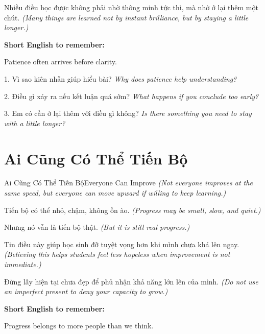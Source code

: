\begin{baihoc}
Nhiều điều học được không phải nhờ thông minh tức thì, mà nhờ ở lại thêm một chút.
\textit{(Many things are learned not by instant brilliance, but by staying a little longer.)}
\end{baihoc}

\begin{ghinhoanh}
\textbf{Short English to remember:}

Patience often arrives before clarity.

\end{ghinhoanh}

\begin{tuhocnhanh}
1. Vì sao kiên nhẫn giúp hiểu bài? \textit{Why does patience help understanding?}

2. Điều gì xảy ra nếu kết luận quá sớm? \textit{What happens if you conclude too early?}

3. Em có cần ở lại thêm với điều gì không? \textit{Is there something you need to stay with a little longer?}
\end{tuhocnhanh}
\ngancach

\section{Ai Cũng Có Thể Tiến Bộ}
\begin{truyen}{Ai Cũng Có Thể Tiến Bộ}{Everyone Can Improve}
\textit{(Not everyone improves at the same speed, but everyone can move upward if willing to keep learning.)}

Tiến bộ có thể nhỏ, chậm, không ồn ào.
\textit{(Progress may be small, slow, and quiet.)}

Nhưng nó vẫn là tiến bộ thật.
\textit{(But it is still real progress.)}

Tin điều này giúp học sinh đỡ tuyệt vọng hơn khi mình chưa khá lên ngay.
\textit{(Believing this helps students feel less hopeless when improvement is not immediate.)}
\end{truyen}

\begin{baihoc}
Đừng lấy hiện tại chưa đẹp để phủ nhận khả năng lớn lên của mình.
\textit{(Do not use an imperfect present to deny your capacity to grow.)}
\end{baihoc}

\begin{ghinhoanh}
\textbf{Short English to remember:}

Progress belongs to more people than we think.

\end{ghinhoanh}

